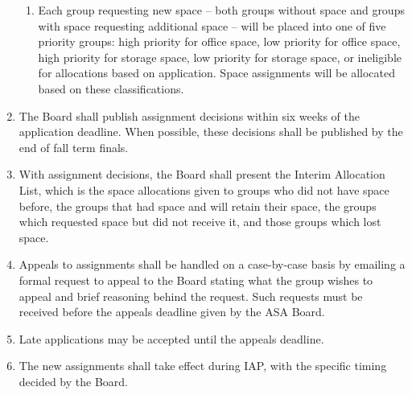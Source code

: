 \documentclass[12pt]{article}
\begin{document}
\begin{enumerate}
\begin{enumerate}
        \item \label{group_alloc_priority_groups} Each group requesting new space -- both groups
            without space and groups with space requesting additional space -- will be placed into
            one of five priority groups:
                high priority for office space, low priority for office space, high priority for storage space,
                low priority for storage space, or ineligible for allocations based on application.
            Space assignments will be allocated based on these classifications.
    \end{enumerate}

    \item The Board shall publish assignment decisions within six weeks of the application deadline.
    When possible, these decisions shall be published by the end of fall term finals.

    \item With assignment decisions, the Board shall present the Interim Allocation List, which is the
        space allocations given to groups who did not have space before, the groups that had
        space and will retain their space, the groups which requested space but did not receive it,
        and those groups which lost space.
    
    \item Appeals to assignments shall be handled on a case-by-case basis by emailing a formal request
        to appeal to the Board stating what the group wishes to appeal and brief reasoning behind
        the request.
    Such requests must be received before the appeals deadline given by the ASA Board.
    \item Late applications may be accepted until the appeals deadline.
    \item The new assignments shall take effect during IAP, with the specific timing decided by the Board.
\end{enumerate}
\end{document}
